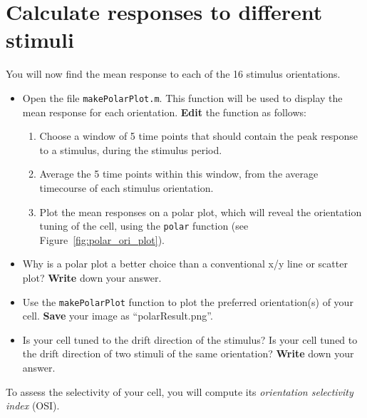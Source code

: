 \documentclass[paper=a4, fontsize=11pt]{article} %
\numberwithin{equation}{section} %
\numberwithin{figure}{section} %
\numberwithin{table}{section} %
\begin{document}
\section{Calculate responses to different stimuli}

You will now find the mean response to each of the 16 stimulus orientations.

\begin{itemize}
\item Open the file \texttt{makePolarPlot.m}. This function will be used to display the mean response for each orientation.
  \textbf{Edit} the function as follows:
  \begin{enumerate}
  \item Choose a window of 5 time points that should contain the peak response to a stimulus, during the stimulus period.
  \item Average the 5 time points within this window, from the average timecourse of each stimulus orientation.
  \item Plot the mean responses on a polar plot, which will reveal the orientation tuning of the cell, using the \texttt{polar} function (see Figure~\ref{fig:polar_ori_plot}).
  \end{enumerate}
\item Why is a polar plot a better choice than a conventional x/y line or scatter plot? \textbf{Write} down your answer.
  \vspace{1em}
\item Use the \texttt{makePolarPlot} function to plot the preferred orientation(s) of your cell. \textbf{Save} your image as ``polarResult.png''.
\item Is your cell tuned to the drift direction of the stimulus? Is your cell tuned to the drift direction of two stimuli of the same orientation?
  \textbf{Write} down your answer.
  \vspace{2em}
\end{itemize}

To assess the selectivity of your cell, you will compute its \emph{orientation selectivity index} (OSI).
\end{document}
